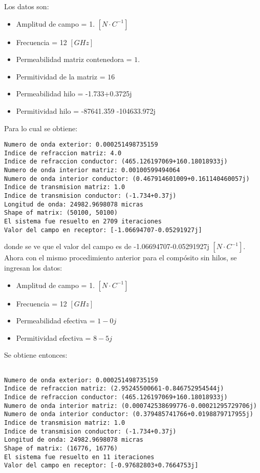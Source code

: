 \documentclass[12pt,letterpaper]{article}
\numberwithin{equation}{section}
\begin{document}
Los datos son:

\begin{itemize}
	\item Amplitud de campo = 1. $[N \cdotp C^{-1}]$
	\item Frecuencia = 12 $[GHz]$
	\item Permeabilidad matriz contenedora = $1.$
	\item Permitividad de la matriz = $16$
	\item Permeabilidad hilo = -1.733+0.3725j
	\item Permitividad hilo = -87641.359 -104633.972j
\end{itemize}


Para lo cual se obtiene:

\begin{lstlisting}
Numero de onda exterior: 0.000251498735159
Indice de refraccion matriz: 4.0
Indice de refraccion conductor: (465.126197069+160.18018933j)
Numero de onda interior matriz: 0.00100599494064
Numero de onda interior conductor: (0.467914601009+0.161140460057j)
Indice de transmision matriz: 1.0
Indice de transmision conductor: (-1.734+0.37j)
Longitud de onda: 24982.9698078 micras
Shape of matrix: (50100, 50100)
El sistema fue resuelto en 2709 iteraciones
Valor del campo en receptor: [-1.06694707-0.05291927j]
\end{lstlisting}

donde se ve que el valor del campo es de -1.06694707-0.05291927j $[N \cdot C^{-1}]$. Ahora con el mismo procedimiento anterior para el compósito sin hilos, se ingresan los datos:

\begin{itemize}
	\item Amplitud de campo = 1. $[N \cdotp C^{-1}]$
	\item Frecuencia = 12 $[GHz]$
	\item Permeabilidad efectiva = $1-0j$
	\item Permitividad efectiva = $8-5j$
\end{itemize}

Se obtiene entonces:

\begin{lstlisting}

Numero de onda exterior: 0.000251498735159
Indice de refraccion matriz: (2.95245500661-0.846752954544j)
Indice de refraccion conductor: (465.126197069+160.18018933j)
Numero de onda interior matriz: (0.000742538699776-0.00021295729706j)
Numero de onda interior conductor: (0.379485741766+0.0198879717955j)
Indice de transmision matriz: 1.0
Indice de transmision conductor: (-1.734+0.37j)
Longitud de onda: 24982.9698078 micras
Shape of matrix: (16776, 16776)
El sistema fue resuelto en 11 iteraciones
Valor del campo en receptor: [-0.97682803+0.7664753j]
\end{lstlisting}
\end{document}
